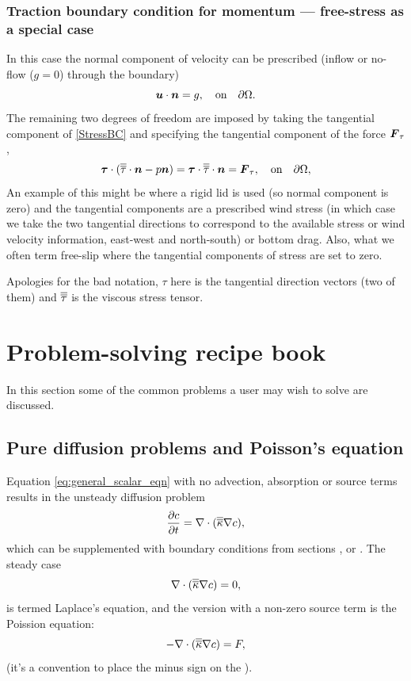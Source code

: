 \subsubsection{Traction boundary condition for momentum --- free-stress as a special case}\label{sect:bc_scalar_traction}
In this case the normal component of velocity can be prescribed (\eg inflow or
no-flow ($g=0$) through the boundary)
\begin{equation*}
\bmu\cdot\bmn = g,\quad \textrm{on}\quad \partial\Omega.
\end{equation*}
The remaining two degrees of freedom are imposed by taking the
tangential component of \eqref{StressBC} and specifying the tangential component
of the force $\bmF_{\tau}$, \ie
\begin{equation*}
\bmtau\cdot(\tautens\cdot\bmn - p\bmn) = \bmtau\cdot\tautens\cdot\bmn = \bmF_{\tau},\quad \textrm{on}\quad \partial\Omega,
\end{equation*}
An example of this might be where a rigid lid is used (so normal component is zero)
and the tangential components are a prescribed wind stress (in which case we take
the two tangential directions to correspond to the available stress or wind velocity
information, \ie east-west and north-south) or bottom drag. Also, what we often term free-slip
where the tangential components of stress are set to zero.

Apologies for the bad notation, $\tau$ here is the tangential direction
vectors (two of them) and $\tautens$ is the viscous stress tensor.




\section{Problem-solving recipe book}
In this section some of the common problems a user may wish to solve are discussed.

\subsection{Pure diffusion problems and Poisson's equation}
Equation \eqref{eq:general_scalar_eqn} with no advection, absorption or source terms results
in the unsteady diffusion problem
\begin{equation}\label{eq:unsteady_diffusion}
\ppt[t]{c}=\nabla\cdot(\kaptens\nabla c),
\end{equation}
which can be supplemented with boundary conditions from sections \label{sect:bc_scalar_dirichlet}, 
\label{sect:bc_scalar_neumann} or \label{sect:bc_scalar_robin}.
The steady case 
\begin{equation}\label{eq:unsteady_diffusion}
\nabla\cdot(\kaptens\nabla c)=0,
\end{equation}
is termed Laplace's equation, and the version with a non-zero source term is the Poission equation:
\begin{equation}\label{eq:unsteady_diffusion}
-\nabla\cdot(\kaptens\nabla c)=F,
\end{equation}
(it's a convention to place the minus sign on the \lhs).


